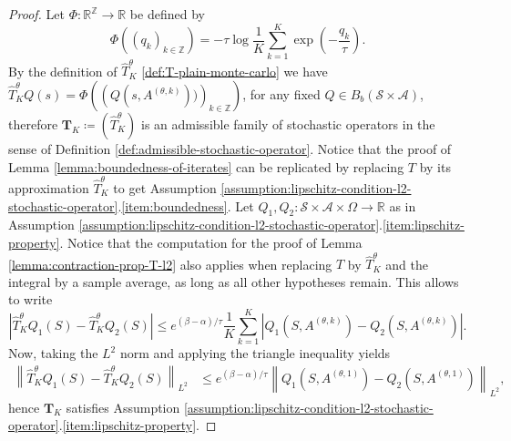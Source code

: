 \documentclass[11pt]{article}
\numberwithin{equation}{section}
\theoremstyle{definition}
\theoremstyle{remark}
\def\R{{\mathbb R}}
\def\Z{{\mathbb{Z}}}
\begin{document}
\begin{proof}
     Let $\Phi:  \R^{\mathbb Z} \rightarrow \R$ be defined by 
    $$
        \Phi ((q_k)_{k \in \Z}) =  -\tau \log \frac{1}{K}\sum_{k = 1}^{K} \exp \left(- \frac{q_k}{\tau}   \right).
    $$
    By the definition of $\hat{T}^\theta_K$ \eqref{def:T-plain-monte-carlo} we have $\hat{T}^\theta_K Q(s) = \Phi\left( \left(Q(s,A^{(\theta,k)}))\right)_{k \in \Z}\right)$, for any fixed $Q \in B_b (\mathcal S \times \mathcal A)$, therefore $ \mathbf{T}_K \coloneqq (\hat{T}^\theta_K)$ is an admissible family of stochastic operators in the sense of Definition \ref{def:admissible-stochastic-operator}.
    Notice that the proof of Lemma \ref{lemma:boundedness-of-iterates} can be replicated by replacing $T$ by its approximation $\hat{T}^\theta_K$ to get Assumption \ref{assumption:lipschitz-condition-l2-stochastic-operator}.\ref{item:boundedness}. Let $Q_1,Q_2:\mathcal S \times \mathcal A \times \Omega \rightarrow \R$ as in Assumption \ref{assumption:lipschitz-condition-l2-stochastic-operator}.\ref{item:lipschitz-property}.
    Notice that the computation for the proof of Lemma \ref{lemma:contraction-prop-T-l2} also applies when replacing $T$ by $\hat{T}^\theta_K$ and the integral by a sample average, as long as all other hypotheses remain.
    This allows to write
    \begin{equation*}
        \left| \hat{T}^\theta_K Q_1 (S) - \hat{T}^\theta_K Q_2 (S)\right| \leq e^{(\beta - \alpha)/ \tau} \frac{1}{K}\sum_{k = 1}^K|Q_1(S,A^{(\theta,k)}) - Q_2(S,A^{(\theta,k)})|.
    \end{equation*}
    Now, taking the $L^2$ norm and applying the triangle inequality yields
    \begin{equation}
    \label{eq:lipschitz-plain-mc}
        \begin{aligned}
            \left\| \hat{T}^\theta_K Q_1(S) - \hat{T}^\theta_K Q_2(S) \right\|_{L^2} & \leq  e^{(\beta - \alpha)/ \tau} \left\|Q_1(S,A^{(\theta,1)}) - Q_2(S,A^{(\theta, 1)})\right\|_{L^2},
        \end{aligned}
    \end{equation}
    hence $ \mathbf{T}_K$ satisfies Assumption \ref{assumption:lipschitz-condition-l2-stochastic-operator}.\ref{item:lipschitz-property}.
\end{proof}
\end{document}
